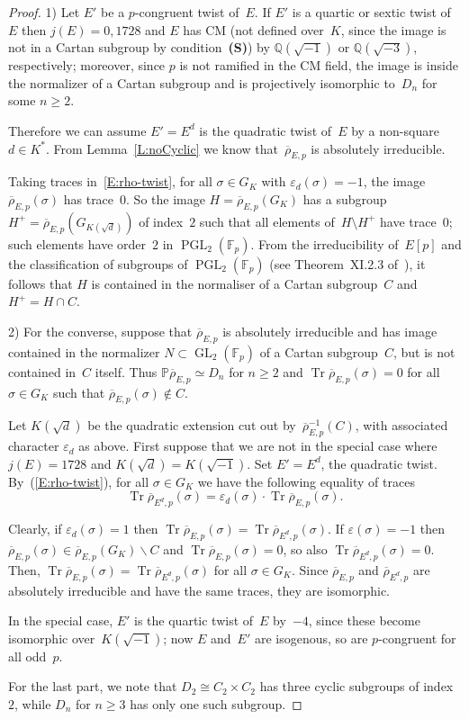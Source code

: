 \documentclass[twoside,leqno,symbols-for-thanks, draft]{rmi}
\numberwithin{equation}{section}
\newcommand{\Fp}{\mathbb{F}_p}
\newcommand{\PP}{\mathbb{P}}
\newcommand{\Q}{\mathbb{Q}}
\newcommand{\rhobar}{{\overline{\rho}}}
\newcommand{\eps}{\varepsilon}
\DeclareMathOperator{\Tr}{Tr}
\newcommand{\GL}{\operatorname{GL}}
\newcommand{\PGL}{\operatorname{PGL}}
\theoremstyle{remark}
\begin{document}
\begin{proof} 1) Let $E'$ be a $p$-congruent twist of~$E$. If $E'$ is
  a quartic or sextic twist of~$E$ then $j(E)=0,1728$ and $E$ has CM
  (not defined over~$K$, since the image is not in a Cartan subgroup by condition~{\bf (S)}) by
  $\Q(\sqrt{-1})$ or $\Q(\sqrt{-3})$, respectively; moreover, since $p$ is
  not ramified in the CM field, the image is inside the normalizer of
  a Cartan subgroup and is projectively
   isomorphic to~$D_n$ for some $n \geq 2$.

Therefore we can assume $E' = E^d$ is the quadratic twist of~$E$ by a
non-square $d\in K^*$.  From Lemma~\ref{L:noCyclic} we know
that~$\rhobar_{E,p}$ is absolutely irreducible.

Taking traces in~\eqref{E:rho-twist}, for all $\sigma\in G_K$ with
$\eps_d(\sigma) = -1$, the image~$\rhobar_{E,p}(\sigma)$ has
trace~$0$.  So the image $H=\rhobar_{E,p}(G_K)$ has a
subgroup~$H^+=\rhobar_{E,p}(G_{K(\sqrt{d})})$ of index~$2$ such that
all elements of~$H\setminus H^+$ have trace~$0$; such elements have
order~$2$ in $\PGL_2(\Fp)$. From the irreducibility of~$E[p]$ and the
classification of subgroups of $\PGL_2(\Fp)$ (see Theorem~XI.2.3
of~\cite{LangModForms}), it follows that $H$ is contained in the
normaliser of a Cartan subgroup~$C$ and $H^+=H\cap C$.

2) For the converse, suppose that $\rhobar_{E,p}$ is absolutely irreducible and has image contained in
the normalizer $N \subset \GL_2(\Fp)$ of a Cartan subgroup~$C$, but
is not contained in~$C$ itself. Thus $\PP \rhobar_{E,p} \simeq D_n$ for $n \geq 2$ and
$\Tr \rhobar_{E,p}(\sigma) = 0$
for all $\sigma \in G_K$ such that $\rhobar_{E,p}(\sigma) \not\in C$.

Let $K(\sqrt{d})$ be the quadratic extension cut out
by~$\rhobar_{E,p}^{-1}(C)$, with associated character $\eps_d$ as
above.  First suppose that we are not in the special case where
$j(E)=1728$ and $K(\sqrt{d})=K(\sqrt{-1})$.  Set $E'=E^d$, the
quadratic twist.  By~(\ref{E:rho-twist}), for all $\sigma \in G_K$ we
have the following equality of traces
\[\Tr \rhobar_{{E^d},p}(\sigma) = \eps_d(\sigma) \cdot \Tr \rhobar_{E,p}(\sigma).\]

Clearly, if $\eps_d(\sigma)=1$ then $\Tr \rhobar_{E,p}(\sigma) = \Tr \rhobar_{E^d,p}(\sigma)$. 
If $\eps(\sigma) = -1$ then $\rhobar_{E,p}(\sigma) \in \rhobar_{E,p} (G_K) \backslash C$ and $\Tr \rhobar_{E,p}(\sigma) = 0$, so also $\Tr \rhobar_{E^d,p}(\sigma) = 0$.
Then, $\Tr \rhobar_{E,p}(\sigma) = \Tr \rhobar_{E^d,p}(\sigma)$ 
for all $\sigma \in G_K$. 
Since $\rhobar_{E,p}$ and $\rhobar_{E^d,p}$ are absolutely irreducible
and have the same traces, they are isomorphic.

In the special case, $E'$ is the quartic twist of~$E$ by~$-4$, since
these become isomorphic over~$K(\sqrt{-1})$; now $E$ and~$E'$ are
isogenous, so are $p$-congruent for all odd~$p$.

For the last part, we note that $D_2\cong C_2\times C_2$ has three
cyclic subgroups of index~$2$, while $D_n$ for $n\ge3$ has only one
such subgroup.
\end{proof}
\end{document}
